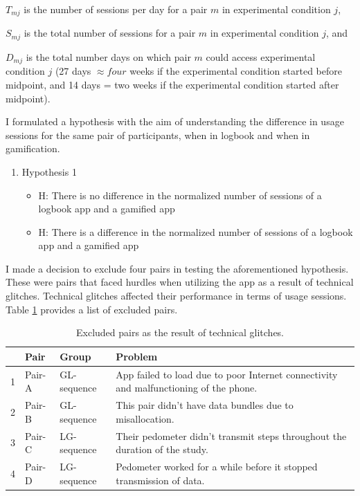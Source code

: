 $T_{mj}$ is the number of sessions per day for a pair $m$ in experimental condition $j$,


 $S_{mj}$ is the total number of sessions for a pair $m$ in experimental condition $j$, and

$D_{mj}$ is the total number days on which pair $m$ could access experimental condition $j$ (27 days $\approx four$ weeks if the experimental condition started before midpoint, and 14 days = two weeks if the experimental condition started after midpoint).

I formulated a hypothesis with the aim of understanding the difference in usage sessions for the same pair of participants, when in logbook and when in gamification.

\begin{enumerate}
   \item{Hypothesis 1}
      \begin{itemize}
       \item{H}: There is no difference in the normalized number of sessions of a logbook app and a gamified app
       \item{H}: There is a difference in the normalized number of sessions of a logbook app and a gamified app
      \end{itemize}
   \end{enumerate}
   
I made a decision to exclude four pairs in testing the aforementioned hypothesis. These were pairs that faced hurdles when utilizing the app as a result of technical glitches. Technical glitches affected their performance in terms of usage sessions. Table \ref{table:usageproblems} provides a list of excluded pairs. 

\begin{table}[h!]
  \begin{center}
    \caption{Excluded pairs as the result of technical glitches.}
    \label{table:usageproblems}
	\begin{tabular}{|l|l|l|p{6cm}|}
		\hline
		&Pair&Group&Problem\\
		\hline
		1&Pair-A&GL-sequence &App failed to load due to poor Internet connectivity and malfunctioning of the phone.\\
		\hline
		2&Pair-B&GL-sequence&This pair didn't have data bundles due to misallocation. \\
		\hline
		3&Pair-C & LG-sequence& Their pedometer didn't transmit steps throughout the duration of the study.\\
		\hline
		4&Pair-D & LG-sequence& Pedometer worked for a while before it stopped transmission of data.\\
	\hline
	\end{tabular}
  \end{center}
\end{table}

